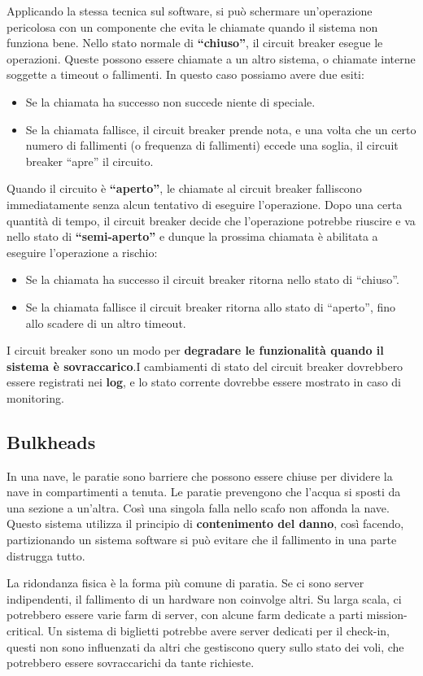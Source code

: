 Applicando la stessa tecnica sul software, si può schermare un’operazione pericolosa con un componente che evita le chiamate quando il sistema non funziona bene. Nello stato normale di \textbf{“chiuso”}, il circuit breaker esegue le operazioni. Queste possono essere chiamate a un altro sistema, o chiamate interne soggette a timeout o fallimenti. In questo caso possiamo avere due esiti:
\begin{itemize}
    \item Se la chiamata ha successo non succede niente di speciale.
    \item Se la chiamata fallisce, il circuit breaker prende nota, e una volta che un certo numero di fallimenti (o frequenza di fallimenti) eccede una soglia, il circuit breaker “apre” il circuito.
\end{itemize}
Quando il circuito è \textbf{“aperto”}, le chiamate al circuit breaker falliscono immediatamente senza alcun tentativo di eseguire l’operazione.
Dopo una certa quantità di tempo, il circuit breaker decide che l’operazione potrebbe riuscire e va nello stato di \textbf{“semi-aperto”} e dunque la prossima chiamata è abilitata a eseguire l’operazione a
rischio:
\begin{itemize}
    \item Se la chiamata ha successo il circuit breaker ritorna nello stato di “chiuso”.
    \item Se la chiamata fallisce il circuit breaker ritorna allo stato di “aperto”, fino allo scadere di un altro timeout.
\end{itemize}
I circuit breaker sono un modo per \textbf{degradare le funzionalità quando il sistema è sovraccarico}.I cambiamenti di stato del circuit breaker dovrebbero essere registrati nei \textbf{log}, e lo stato corrente dovrebbe essere mostrato in caso di monitoring.

\subsection{Bulkheads}
In una nave, le paratie sono barriere che possono essere chiuse per dividere la nave in compartimenti a tenuta. Le paratie prevengono che l’acqua si sposti da una sezione a un'altra. Così una singola falla nello scafo non affonda la nave. Questo sistema utilizza il principio di \textbf{contenimento del danno}, così facendo, partizionando un sistema software si può evitare che il fallimento in una parte distrugga tutto.

La ridondanza fisica è la forma più comune di paratia. Se ci sono server indipendenti, il fallimento di un hardware non coinvolge altri. Su larga scala, ci potrebbero essere varie farm di server, con alcune farm dedicate a parti mission-critical. Un sistema di biglietti potrebbe avere server dedicati per il check-in, questi non sono influenzati da altri che gestiscono query sullo stato dei voli, che potrebbero essere sovraccarichi da tante richieste.

